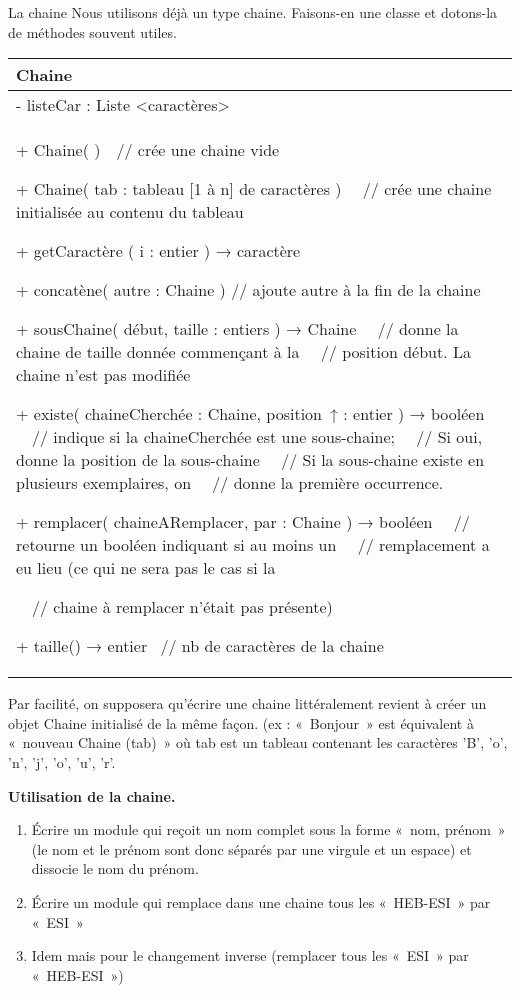 \begin{Exercice}{La chaine}
	Nous utilisons déjà un type chaine.
	Faisons-en une classe et dotons-la de
	méthodes souvent utiles.

	\begin{center}
	\tablehead{}
	\begin{supertabular}{|m{11.597cm}|}
		\hline
		\centering\arraybslash  Chaine\\\hline
		 {}- listeCar : Liste <caractères>\\\hline
		{ + Chaine( )\ \ // crée une chaine vide}

		{ {+ }Chaine( tab : tableau [1 à n] de caractères )
		\ \ // crée une chaine initialisée au contenu du tableau}

		{ {+ getCaractère ( i : entier ) }\textsf{→} {caractère}}

		{ + concatène( autre : Chaine ) // ajoute autre à
		la fin de la chaine}

		{ {+ sousChaine( début,
		taille : entiers ) }\textsf{→} {Chaine
		\ \ // donne la chaine de taille donnée commençant à la
		\ \ // position début. La chaine n'est pas modifiée}}

		{ {+ existe(
		chaineCherchée : Chaine, position~}\textsf{↑}
		:{ entier ) }\textsf{→}
		{booléen
		\ \ // indique si la chaineCherchée est une sous-chaine;
		\ \ // Si oui, donne la position de la sous-chaine
		\ \ // Si la sous-chaine existe en plusieurs exemplaires, on
		\ \ // donne la première occurrence.}}

		{ {+ remplacer(
		chaineARemplacer, par : Chaine ) }\textsf{→}
		{booléen
		\ \ // retourne un booléen indiquant si au moins un
		\ \ // remplacement a eu lieu (ce qui ne sera pas le cas si la}}

		{ \ \ // chaine à remplacer n’était pas
		présente)}

		 {+ taille() }\textsf{→}
		{entier \ // nb de caractères de la
		chaine}\\\hline
	\end{supertabular}
	\end{center}
	
	Par facilité, on supposera qu’écrire une chaine littéralement revient à
	créer un objet Chaine initialisé de la même façon. (ex : «~Bonjour~»
	est équivalent à «~nouveau Chaine (tab)~» où tab est un tableau
	contenant les caractères 'B',
	'o',
	'n',
	'j',
	'o',
	'u',
	'r'.

	\textbf{Utilisation de la chaine.}

	\begin{enumerate}[label=\alph*)]
		\item 
			Écrire un module qui reçoit un nom complet
			sous la forme «~nom, prénom~» (le nom et le prénom sont donc séparés
			par une virgule et un espace) et dissocie le nom du prénom. 
		\item 
			Écrire un module qui remplace dans une chaine
			tous les «~HEB-ESI~» par «~ESI~»
		\item 
			Idem mais pour le changement inverse 
			(remplacer tous les «~ESI~» par «~HEB-ESI~»)
	\end{enumerate}
\end{Exercice}

